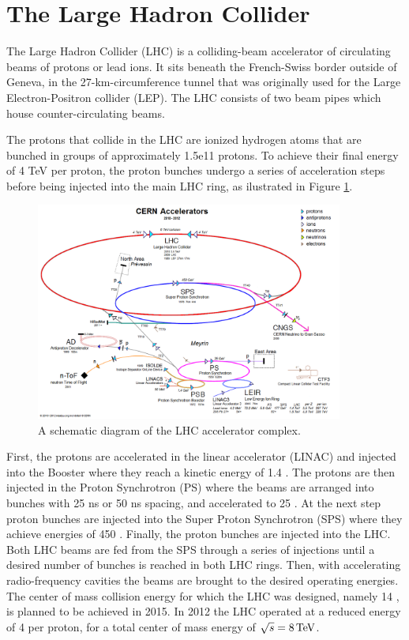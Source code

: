 \section{The Large Hadron Collider}

The Large Hadron Collider (LHC) \cite{Evans:2008zzb,Bruning:2004ej} is a colliding-beam accelerator 
of circulating beams of protons
or lead ions. 
It sits beneath the French-Swiss border outside of Geneva, in the 27-km-circumference tunnel that was originally used
for the Large Electron-Positron collider (LEP). 
 The LHC consists of two beam pipes which house counter-circulating beams.

The protons that collide in the LHC are ionized hydrogen atoms that are bunched in groups
of approximately 1.5e11 protons. To achieve their final energy of 4 TeV per proton,
the proton bunches undergo a series of acceleration steps before being injected into
the main LHC ring, as ilustrated in Figure \ref{fig:accelerators}.

\begin{figure}[htbp]
\centering
\includegraphics[width=0.9\textwidth]{plots/intro/accelerators.png}
\caption{A schematic diagram of the LHC accelerator complex.\label{fig:accelerators}}
\end{figure}

First, the protons are accelerated in the linear accelerator (LINAC) and injected into 
the Booster where they reach a kinetic energy of 1.4 \GeV. The protons are then injected
in the Proton Synchrotron (PS) where the beams are arranged into bunches
with 25 ns or 50 ns spacing, and accelerated to 25 \GeV. At the next step
 proton bunches are injected
into the Super Proton Synchrotron (SPS) where they achieve energies of 450 \GeV. Finally, the proton
bunches are injected into the LHC. Both LHC beams are fed from the SPS through a series of injections
until a desired number of bunches is reached in both LHC rings. Then, with accelerating 
radio-frequency cavities the beams are brought to the desired operating energies.
The center of mass collision energy for which the LHC was designed, namely 14 \TeV,
 is planned to be achieved in 2015.
In 2012 the LHC operated at a reduced energy of 4 \TeV per proton, for a total
center of mass energy of $\sqrt{s} = 8 \,\text{Te\hspace{-.08em}V}$.

